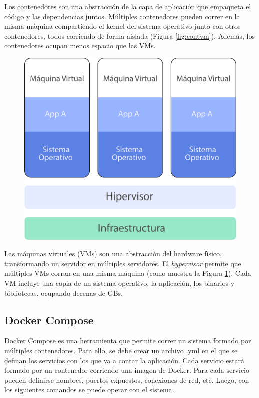 \break

Los contenedores son una abstracción de la capa de aplicación que empaqueta el código y las dependencias juntos. Múltiples contenedores pueden correr en la misma máquina compartiendo el kernel del sistema operativo junto con otros contenedores, todos corriendo de forma aislada (Figura \ref{fig:contvm}). Además, los contenedores ocupan menos espacio que las VMs.

\begin{figure}[h!]
  \centering
    \includegraphics[scale=0.7]{images/vms.png}
  \label{fig:vm}
\end{figure}

\break

Las máquinas virtuales (VMs) son una abstracción del hardware físico, transformando un servidor en múltiples servidores. El \textit{hypervisor} permite que múltiples VMs corran en una misma máquina (como muestra la Figura \ref{fig:vm}). Cada VM incluye una copia de un sistema operativo, la aplicación, los binarios y bibliotecas, ocupando decenas de GBs. 

\subsection[Docker Compose]{Docker Compose}

Docker Compose es una herramienta que permite correr un sistema formado por múltiples contenedores. Para ello, se debe crear un archivo .yml en el que se definan los servicios con los que va a contar la aplicación. Cada servicio estará formado por un contenedor corriendo una imagen de Docker. 
Para cada servicio pueden definirse nombres, puertos expuestos, conexiones de red, etc. Luego, con los siguientes comandos se puede operar con el sistema.

